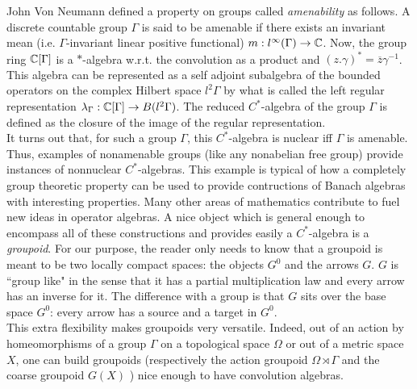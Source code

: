 John Von Neumann defined a property on groups called \textit{amenability} as follows. A discrete countable group $\Gamma$ is said to be amenable if there exists an invariant mean (i.e. $\Gamma$-invariant linear positive functional) $m: l^\infty(\Gamma)\rightarrow \mathbb{C}$. Now, the group ring $\mathbb{C}[\Gamma]$ is a $*$-algebra w.r.t. the convolution as a product and $(z. \gamma)^* = \overline{z}\gamma^{-1}$. This algebra can be represented as a self adjoint subalgebra of the bounded operators on the complex Hilbert space $l^2\Gamma$ by what is called the left regular representation $\lambda_\Gamma: \mathbb{C}[\Gamma]\rightarrow B(l^2\Gamma)$. The reduced $C^*$-algebra of the group $\Gamma$ is defined as the closure of the image of the regular representation.\\

It turns out that, for such a group $\Gamma$, this $C^*$-algebra is nuclear iff $\Gamma$ is amenable. Thus, examples of nonamenable groups (like any nonabelian free group) provide instances of nonnuclear $C^*$-algebras. This example is typical of how a completely group theoretic property can be used to provide contructions of Banach algebras with interesting properties. Many other areas of mathematics contribute to fuel new ideas in operator algebras. A nice object which is general enough to encompass all of these constructions and provides easily a $C^*$-algebra is a \textit{groupoid}. For our purpose, the reader only needs to know that a groupoid is meant to be two locally compact spaces: the objects $G^0$ and the arrows $G$. $G$ is ``group like" in the sense that it has a partial multiplication law and every arrow has an inverse for it. The difference with a group is that $G$ sits over the base space $G^0$: every arrow has a source and a target in $G^0$.\\  

This extra flexibility makes groupoids very versatile. Indeed, out of an action by homeomorphisms of a group $\Gamma$ on a topological space $\Omega$ or out of a metric space $X$, one can build groupoids (respectively the action groupoid $\Omega \rtimes \Gamma$ and the coarse groupoid $G(X)$ \cite{SkTuYu}) nice enough to have convolution algebras. \\  


